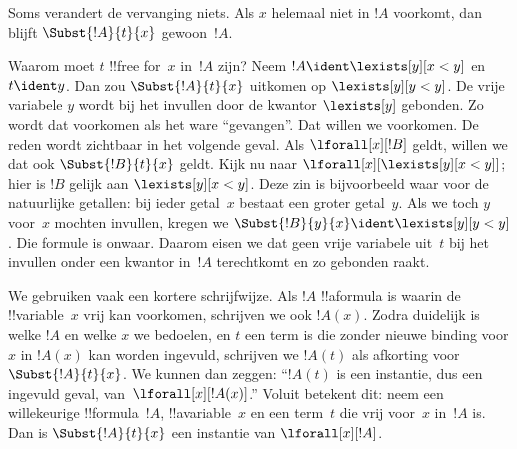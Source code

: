 \documentclass[openany]{memoir}
\begin{document}
\begin{defn}
\begin{enumerate}


\end{enumerate}
\end{defn}

\begin{explain}
Soms verandert de vervanging niets. Als $x$ helemaal niet in $!A$
voorkomt, dan blijft $\Subst{!A}{t}{x}$ gewoon~$!A$.

Waarom moet $t$ !!{free for}~$x$ in~$!A$ zijn? Neem
$!A \ident \lexists[y][x < y]$ en $t \ident y$. Dan zou
$\Subst{!A}{t}{x}$ uitkomen op $\lexists[y][y < y]$. De vrije variabele
$y$ wordt bij het invullen door de kwantor $\lexists[y]$ gebonden. Zo
wordt dat voorkomen als het ware ``gevangen''. Dat willen we voorkomen.
De reden wordt zichtbaar in het volgende geval. Als
$\lforall[x][!B]$ geldt, willen we dat ook $\Subst{!B}{t}{x}$ geldt.
Kijk nu naar $\lforall[x][\lexists[y][x < y]]$; hier is $!B$ gelijk
aan $\lexists[y][x < y]$. Deze zin is bijvoorbeeld waar voor de
natuurlijke getallen: bij ieder getal~$x$ bestaat een groter getal~$y$.
Als we toch $y$ voor~$x$ mochten invullen, kregen we
$\Subst{!B}{y}{x} \ident \lexists[y][y < y]$. Die formule is onwaar.
Daarom eisen we dat geen vrije variabele uit~$t$ bij het invullen onder
een kwantor in~$!A$ terechtkomt en zo gebonden raakt.
\end{explain}

We gebruiken vaak een kortere schrijfwijze. Als $!A$ !!a{formula} is
waarin de !!{variable}~$x$ vrij kan voorkomen, schrijven we ook
$!A(x)$. Zodra duidelijk is welke $!A$ en welke $x$ we bedoelen, en
$t$ een term is die zonder nieuwe binding voor $x$ in $!A(x)$ kan
worden ingevuld, schrijven we $!A(t)$ als afkorting voor
$\Subst{!A}{t}{x}$.
We kunnen dan zeggen: ``$!A(t)$ is een instantie, dus een ingevuld
geval, van~$\lforall[x][!A(x)]$.'' Voluit betekent dit: neem een
willekeurige !!{formula}~$!A$, !!a{variable}~$x$ en een term~$t$ die
vrij voor~$x$ in~$!A$ is. Dan is $\Subst{!A}{t}{x}$ een instantie van
$\lforall[x][!A]$.
\endgroup
\OLEndChapterHook
\end{document}
